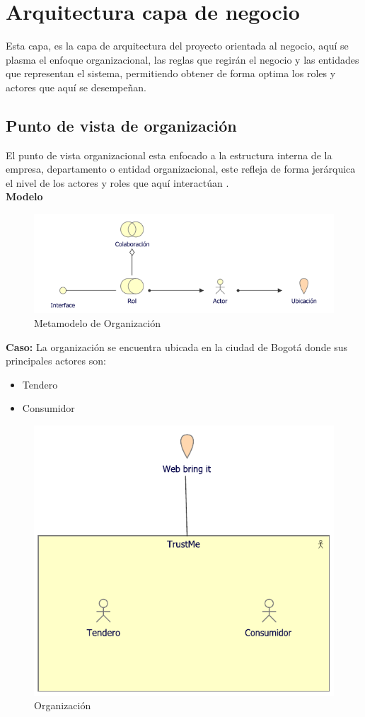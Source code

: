 \section{Arquitectura capa de negocio}
{Esta capa, es la capa de arquitectura del proyecto orientada al negocio, aquí se plasma el enfoque organizacional, las reglas que regirán el negocio y las entidades que representan el sistema, permitiendo obtener de forma optima los roles y actores que aquí se desempeñan.}

	\subsection{Punto de vista de organización}
	{ El punto de vista organizacional esta enfocado a la estructura interna de la empresa, departamento o entidad organizacional, este refleja de forma jerárquica el nivel de los actores y roles que aquí interactúan \cite{archimate}.\\
		
		\textbf{Modelo}\\
		\begin{figure}[H]
			\centering
			\includegraphics[width=0.8\linewidth]{development/organizacion.png}
			\caption{Metamodelo de Organización}
		\end{figure}
	
		\textbf{Caso:} La organización se encuentra ubicada en la ciudad de Bogotá donde sus principales actores son:
		
		\begin{itemize}
			\item Tendero
			\item Consumidor
		\end{itemize}
		
		\begin{figure}[H]
			\centering
			\includegraphics[width=0.6\linewidth]{development/negocio.pdf}
			\caption{Organización}
		\end{figure}
	}
	
